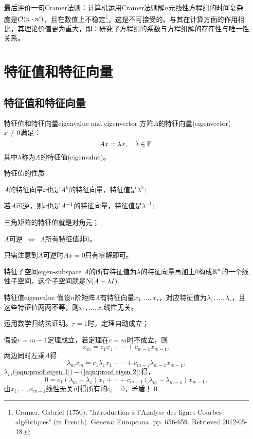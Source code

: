 最后评价一句Cramer法则：计算机运用Cramer法则解$n$元线性方程组的时间复杂度是$\mathcal O(n\cdot n!)$，且在数值上不稳定\footnote{Cramer, Gabriel (1750). "Introduction à l'Analyse des lignes Courbes algébriques" (in French). Geneva: Europeana. pp. 656-659. Retrieved 2012-05-18.}，这是不可接受的。与其在计算方面的作用相比，其理论价值更为重大，即：研究了方程组的系数与方程组解的存在性与唯一性关系。
\clearpage
\section{特征值和特征向量}
\subsection{特征值和特征向量}
\begin{definition}{特征值和特征向量}{eigenvalue and eigenvector}
	方阵$A$的特征向量(eigenvector)~$x\neq 0$满足：
	\[
		Ax=\lambda x,\quad\lambda\in\mathbb F.
	\]
	其中$\lambda$称为$A$的特征值(eigenvalue)。
\end{definition}
\begin{theorem}{特征值的性质}{}
	\begin{compactenum}
		\item $A$的特征向量$x$也是$A^n$的特征向量，特征值是$\lambda^n;$
		\item 若$A$可逆，则$x$也是$A^{-1}$的特征向量，特征值是$\lambda^{-1};$
		\item 三角矩阵的特征值就是对角元；
		\item $A$可逆$\enspace\Leftrightarrow\enspace A$所有特征值非0。
		
		只需注意到$A$可逆时$Ax=0$只有零解即可。
	\end{compactenum}
\end{theorem}
\begin{definition}{特征子空间}{eigen-subspace}
	$A$的所有特征值为$\lambda$的特征向量再加上0构成$\mathbb R^n$的一个线性子空间，这个子空间就是$\operatorname{N}(A-\lambda I).$
\end{definition}
\begin{theorem}{特征值}{eigenvalue}
	假设$n$阶矩阵$A$有特征向量$x_1,\ldots,x_r$，对应特征值为$\lambda_1,\ldots,\lambda_r$，且这些特征值两两不等，则$x_1,\ldots,x_r$线性无关。
\end{theorem}
\prf 运用数学归纳法证明。$r=1$时，定理自动成立；

假设$r=m-1$定理成立，若定理在$r=m$时不成立，则
\begin{equation}
	\label{eqn:proof eigen 1}
	x_m=c_1x_1+\cdots+c_{m-1}x_{m-1},\tag{$\ast$}
\end{equation}
两边同时左乘$A$得
\begin{equation}
	\label{eqn:proof eigen 2}
	\lambda_mx_m=c_1\lambda_1x_1+\cdots+c_{m-1}\lambda_{m-1}x_{m-1},\tag{$\ast\ast$}
\end{equation}
$\lambda_m($\ref{eqn:proof eigen 1}$)-($\ref{eqn:proof eigen 2}$)$得，
\[
	0=c_1(\lambda_m-\lambda_1)x_1+\cdots+c_{m-1}(\lambda_m-\lambda_{m-1})x_{m-1},
\]
由$x_1,\ldots,x_{m-1}$线性无关可得所有的$c_i=0$，矛盾！\qed
